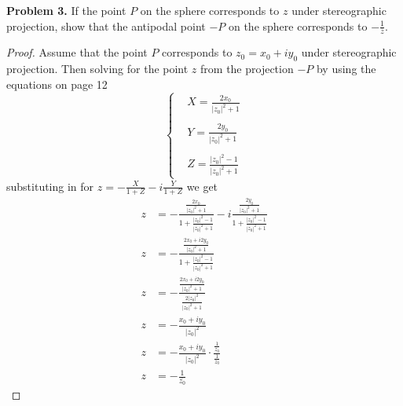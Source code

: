 \documentclass[letter,12pt]{article}
\begin{document}
\begin{tabbing}

\end{tabbing}

\begin{tcolorbox}
    \textbf{Problem 3.} If the point $P$ on the sphere corresponds to $z$ under stereographic projection, show that the antipodal point $-P$ on the sphere corresponds to $-\frac{1}{\overline{z}}$.
\end{tcolorbox}

\begin{proof}
    Assume that the point $P$ corresponds to $z_0=x_0+iy_0$ under stereographic projection. Then solving for the point $z$ from the projection $-P$ by using the equations on page 12
    \[
        \begin{cases}
             & X=\frac{2x_0}{|z_0|^2+1}       \\
            \\
             & Y = \frac{2y_0}{|z_0|^2+1}     \\
            \\
             & Z= \frac{|z_0|^2-1}{|z_0|^2+1}
        \end{cases}
    \] substituting in for $z=-\frac{X}{1+Z}-i\frac{Y}{1+Z}$ we get
    \begin{align*}
        z & =-\frac{\frac{2x_0}{|z_0|^2+1}}{1+\frac{|z_0|^2-1}{|z_0|^2+1}}-i\frac{\frac{2y_0}{|z_0|^2+1}}{1+\frac{|z_0|^2-1}{|z_0|^2+1}} \\
        z & = -\frac{\frac{2x_0+i2y_0}{|z_0|^2+1}}{1+\frac{|z_0|^2-1}{|z_0|^2+1}}                                                        \\
        z & = -\frac{\frac{2x_0+i2y_0}{|z_0|^2+1}}{\frac{2|z_0|^2}{|z_0|^2+1}}
        \\
        z & = -\frac{x_0+iy_0}{|z_0|^2}                                                                                                  \\
        z & = -\frac{x_0+iy_0}{|z_0|^2}\cdot \frac{\frac{1}{z_0}}{\frac{1}{z_0}}                                                         \\
        z & = -\frac{1}{\bar{z_0}}
    \end{align*}



\end{proof}
\end{document}
